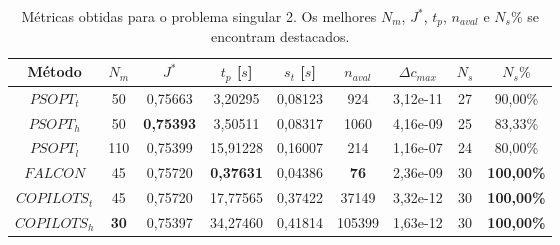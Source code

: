\begin{table}[!h]
	\centering
	\caption[Métricas obtidas para o problema singular 2]{Métricas obtidas para o problema singular 2. Os melhores $ N_m $, $ J^* $, $ t_p $, $ n_{aval} $ e $ N_s\% $ se encontram destacados.}
	\label{tab:singular2:raw}
	\begin{tabular}{ccccccccc}
		\hline
		Método       & $N_m$                              & $J^*$                                   & $t_p$ {[}$s${]}                         & $s_t$ {[}$s${]} & $n_{aval}$                         & $\Delta c_{max}$                & $N_s$ & $N_s\%$                                  \\ \hline
		$PSOPT_t$    & 50                                 & 0,75663                                 & 3,20295                                 & 0,08123         & 924                                & 3,12e-11                        & 27    & 90,00\%                                  \\
		$PSOPT_h$    & 50                                 & {\color[HTML]{009901} \textbf{0,75393}} & 3,50511                                 & 0,08317         & 1060                               & 4,16e-09                        & 25    & 83,33\%                                  \\
		$PSOPT_l$    & 110                                & 0,75399                                 & 15,91228                                & 0,16007         & 214                                & 1,16e-07                        & 24    & 80,00\%                                  \\
		$FALCON$     & 45                                 & 0,75720                                 & {\color[HTML]{009901} \textbf{0,37631}} & 0,04386         & {\color[HTML]{009901} \textbf{76}} & 2,36e-09                        & 30    & {\color[HTML]{009901} \textbf{100,00\%}} \\
		$COPILOTS_t$ & 45                                 & 0,75720                                 & 17,77565                                & 0,37422         & 37149                              & 3,32e-12                        & 30    & {\color[HTML]{009901} \textbf{100,00\%}} \\
		$COPILOTS_h$ & {\color[HTML]{009901} \textbf{30}} & 0,75397                                 & 34,27460                                & 0,41814         & 105399                             & {\color[HTML]{000000} 1,63e-12} & 30    & {\color[HTML]{009901} \textbf{100,00\%}} \\ \hline
	\end{tabular}
\end{table}